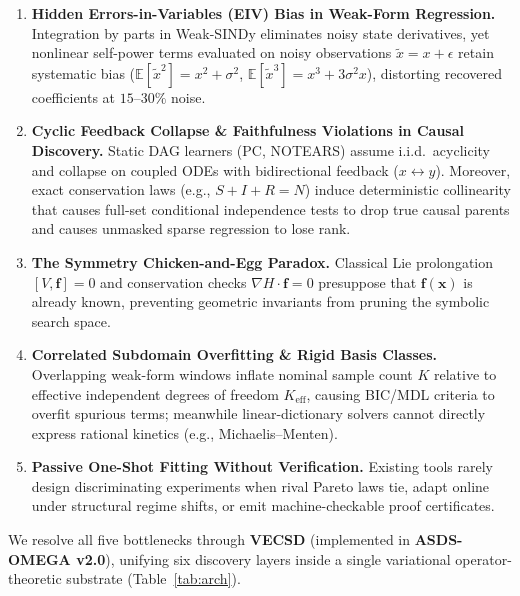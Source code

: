 \documentclass[10pt]{article} %
\begin{document}
\begin{enumerate}
  \item \textbf{Hidden Errors-in-Variables (EIV) Bias in Weak-Form Regression.} Integration by parts in Weak-SINDy \citep{messenger2021weak} eliminates noisy state derivatives, yet nonlinear self-power terms evaluated on noisy observations $\tilde{x} = x + \epsilon$ retain systematic bias ($\mathbb{E}[\tilde{x}^2] = x^2 + \sigma^2$, $\mathbb{E}[\tilde{x}^3] = x^3 + 3\sigma^2 x$), distorting recovered coefficients at $15\text{--}30\%$ noise.
  \item \textbf{Cyclic Feedback Collapse \& Faithfulness Violations in Causal Discovery.} Static DAG learners (PC, NOTEARS) assume i.i.d.\ acyclicity and collapse on coupled ODEs with bidirectional feedback ($x \leftrightarrow y$). Moreover, exact conservation laws (e.g., $S+I+R=N$) induce deterministic collinearity that causes full-set conditional independence tests to drop true causal parents and causes unmasked sparse regression to lose rank.
  \item \textbf{The Symmetry Chicken-and-Egg Paradox.} Classical Lie prolongation $[V, \mathbf{f}]=0$ and conservation checks $\nabla H \cdot \mathbf{f} = 0$ presuppose that $\mathbf{f}(\mathbf{x})$ is already known, preventing geometric invariants from pruning the symbolic search space.
  \item \textbf{Correlated Subdomain Overfitting \& Rigid Basis Classes.} Overlapping weak-form windows inflate nominal sample count $K$ relative to effective independent degrees of freedom $K_{\text{eff}}$, causing BIC/MDL criteria to overfit spurious terms; meanwhile linear-dictionary solvers cannot directly express rational kinetics (e.g., Michaelis--Menten).
  \item \textbf{Passive One-Shot Fitting Without Verification.} Existing tools rarely design discriminating experiments when rival Pareto laws tie, adapt online under structural regime shifts, or emit machine-checkable proof certificates.
\end{enumerate}

We resolve all five bottlenecks through \textbf{VECSD} (implemented in \textbf{ASDS-OMEGA v2.0}), unifying six discovery layers inside a single variational operator-theoretic substrate (Table~\ref{tab:arch}).

\end{document}
